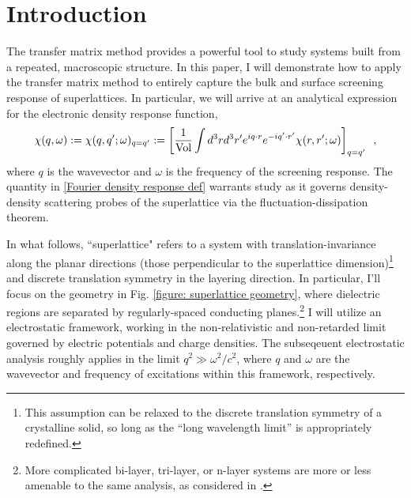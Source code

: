\section*{Introduction}

The transfer matrix method provides a powerful tool to study systems built from a repeated, macroscopic structure.  In this paper, I will demonstrate how to apply the transfer matrix method to entirely capture the bulk and surface screening response of superlattices.  In particular, we will arrive at an analytical expression for the electronic density response function,
\begin{equation}
    \label{Fourier density response def}
    \chi(q,\omega):=\chi(q,q';\omega)_{q=q'}
    :=
    \left[\frac{1}{\text{Vol}}\int d^3 r d^3 r' e^{iq\cdot r} e^{-i q'\cdot r'}\chi(r,r';\omega)\right]_{q=q'}
    \,\,\,,
\end{equation}
where $q$ is the wavevector and $\omega$ is the frequency of the screening response.  The quantity in \eqref{Fourier density response def} warrants study as it governs density-density scattering probes of the superlattice via the fluctuation-dissipation theorem.

In what follows, ``superlattice" refers to a system with translation-invariance along the planar directions (those perpendicular to the superlattice dimension)\footnote{This assumption can be relaxed to the discrete translation symmetry of a crystalline solid, so long as the ``long wavelength limit'' is appropriately redefined.} and discrete translation symmetry in the layering direction.  In particular, I'll focus on the geometry in Fig. \ref{figure: superlattice geometry}, where dielectric regions are separated by regularly-spaced conducting planes.\footnote{More complicated bi-layer, tri-layer, or n-layer systems are more or less amenable to the same analysis, as considered in \cite{Cottam1993, Cottam2004}.}  I will utilize an electrostatic framework, working in the non-relativistic and non-retarded limit governed by electric potentials and charge densities.  The subseqeuent electrostatic analysis roughly applies in the limit $q^2\gg \omega^2/c^2$, where $q$ and $\omega$ are the wavevector and frequency of excitations within this framework, respectively.

